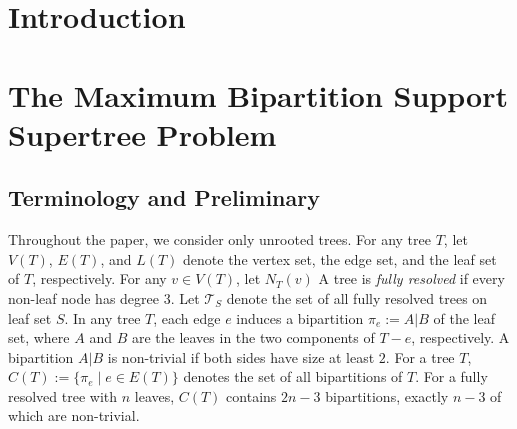 \documentclass{bmcart}
\begin{document}


\section{Introduction}






\section{The Maximum Bipartition Support Supertree Problem} \label{sec:alg}
\subsection{Terminology and Preliminary}

Throughout the paper, we consider only unrooted trees. For any tree $T$, let $V(T)$, $E(T)$, and $L(T)$ denote the vertex set, the edge set, and the leaf set of $T$, respectively. For any $v\in V(T)$, let $N_T(v)$  A tree is \textit{fully resolved} if every non-leaf node has degree $3$. Let $\mathcal{T}_S$ denote the set of all fully resolved trees on leaf set $S$. In any tree $T$, each edge $e$ induces a bipartition $\pi_e := A|B$ of the leaf set, where $A$ and $B$ are the leaves in the two components of $T-e$, respectively. A bipartition $A|B$ is non-trivial if both sides have size at least $2$. For a tree $T$, $C(T) := \{\pi_e \mid e\in E(T)\}$ denotes the set of all bipartitions of $T$. For a fully resolved tree with $n$ leaves, $C(T)$ contains $2n-3$ bipartitions, exactly $n-3$ of which are non-trivial. \\
\end{document}
